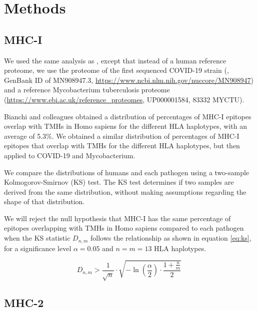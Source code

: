 \documentclass{article}
\begin{document}
\section{Methods}

\subsection{MHC-I}

We used the same analysis as \cite{bianchi2017},
except that instead of a human reference proteome,
we use the proteome of the first sequenced COVID-19 strain (\cite{wu2020new},
GenBank ID of MN908947.3, \url{https://www.ncbi.nlm.nih.gov/nuccore/MN908947})
and a reference Mycobacterium tuberculosis 
proteome (\url{https://www.ebi.ac.uk/reference_proteomes}, UP000001584, 
83332 MYCTU).

Bianchi and colleagues obtained a distribution of 
percentages of MHC-I epitopes overlap with TMHs in Homo sapiens
for the different HLA haplotypes, with an average of 5.3\%.
We obtained a similar distribution of percentages of MHC-I epitopes that 
overlap with TMHs for the different HLA haplotypes, but then applied to
COVID-19 and Mycobacterium.

We compare the distributions of humans and each pathogen
using a two-sample 
Kolmogorov-Smirnov (KS) test. The KS test determines if two samples
are derived from the same distribution, without making assumptions
regarding the shape of that distribution. 

We will reject
the null hypothesis that MHC-I has the same percentage of epitopes 
overlapping with TMHs in Homo sapiens compared to each pathogen when 
the KS statistic $D_{n,m}$ follows the relationship as shown in 
equation \ref{eq:ks}, for a significance level $\alpha = 0.05$
and $n = m = 13$ HLA haplotypes.

\begin{equation}
   D_{n,m} > \frac{1}{\sqrt{n}} \cdot \sqrt{ -\ln(\frac{\alpha}{2}) \cdot \frac{1 + \frac{n}{m}}{2} }
\  \label{eq:ks}
\end{equation}

\subsection{MHC-2}
\end{document}
